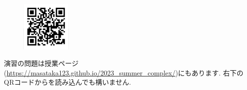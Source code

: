 \documentclass[dvipdfmx,a4paper,11pt]{article}
\theoremstyle{definition}
\begin{document}
 
 \vspace{11pt}\begin{figure}  \centering\includegraphics[height=25mm, width=25mm]{complex.png}\end{figure}

演習の問題は授業ページ(\url{https://masataka123.github.io/2023_summer_complex/})にもあります. 右下のQRコードからを読み込んでも構いません.


  
  
 
\end{document}
